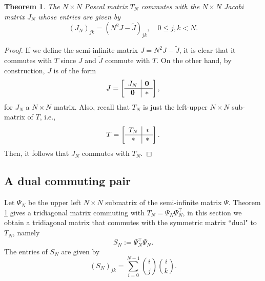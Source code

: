 \documentclass[11pt]{amsart}
\theoremstyle{plain}
\newtheorem{theorem}{Theorem}[section]
\theoremstyle{named}
\def \wt {\widetilde}
\begin{document}
\begin{theorem}\label{T2}
The $N\times N$ Pascal matrix $T_N$ commutes with the $N\times N$ Jacobi matrix $J_N$ whose entries are given by
$$(J_N)_{jk} = (N^2J - \wt J)_{jk},\quad 0\leq j,k < N.$$
\end{theorem}
\begin{proof}
If we define the semi-infinite matrix $J=N^2J - \wt J$, it is clear that it commutes with $T$ since $J$ and $\wt J$ commute with $T$. On the other hand, by construction, $J$ is of the form
$$J=
\left[\begin{array}{c|c}
J_N&\bf 0\\\hline
\bf 0 & *
\end{array}\right],
$$
for $J_N$ a $N\times N$ matrix. 
Also, recall that $T_N$ is just the left-upper $N\times N$ sub-matrix of $T$, i.e., 
$$T=
\left[\begin{array}{c|c}
T_N&\bf *\\\hline
\bf * & \bf*
\end{array}\right].
$$
Then, it follows that $J_N$ commutes with $T_N$.
\end{proof}



\subsection{A dual commuting pair}
Let $\Psi_N$ be the upper left $N\times N$ submatrix of the semi-infinite matrix $\Psi$.
Theorem \ref{T2} gives a tridiagonal matrix commuting with $T_N=\Psi_N\Psi_N^\intercal$, in this section we obtain a tridiagonal matrix that commutes with the symmetric matrix ``dual" to $T_N$, namely
$$S_N := \Psi_N^\intercal\Psi_N.$$
The entries of $S_N$ are given by
$$(S_N)_{jk} = \sum_{i=0}^{N-1}\binom{i}{j}\binom{i}{k}.$$
\end{document}
